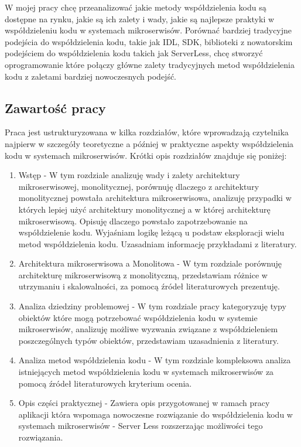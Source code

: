 \documentclass[runningheads,12pt]{llncs}
\begin{document}
W mojej pracy chcę przeanalizować jakie metody współdzielenia kodu są dostępne na rynku, jakie są ich zalety i wady, jakie są najlepsze praktyki w współdzieleniu kodu w systemach mikroserwisów. Porównać bardziej tradycyjne podejścia do współdzielenia kodu, takie jak IDL, SDK, biblioteki z nowatorskim podejściem do współdzielenia kodu takich jak ServerLess, chcę stworzyć oprogramowanie które połączy główne zalety tradycyjnych metod współdzielenia kodu z zaletami bardziej nowoczesnych podejść.

\newpage

\subsection{Zawartość pracy}
Praca jest ustrukturyzowana w kilka rozdziałów, które wprowadzają czytelnika najpierw w szczegóły teoretyczne a później w praktyczne aspekty współdzielenia kodu w systemach mikroserwisów. Krótki opis rozdziałów znajduje się poniżej:
\begin{enumerate}
    \item Wstęp - W tym rozdziale analizuję wady i zalety architektury mikroserwisowej, monolitycznej, porównuję dlaczego z architektury monolitycznej powstała architektura mikroserwisowa, analizuję przypadki w których lepiej użyć architektury monolitycznej a w której architekturę mikroserwisową. Opisuję dlaczego powstało zapotrzebowanie na współdzielenie kodu. Wyjaśniam logikę leżącą u podstaw eksploracji wielu metod współdzielenia kodu. Uzasadniam informację przykładami z literatury.
    \item Architektura mikroserwisowa a Monolitowa - W tym rozdziale porównuję architekturę mikroserwisową z monolityczną, przedstawiam różnice w utrzymaniu i skalowalności, za pomocą źródeł literaturowych prezentuję.
    \item Analiza dziedziny problemowej - W tym rozdziale pracy kategoryzuję typy obiektów które mogą potrzebować współdzielenia kodu w systemie mikroserwisów, analizuję możliwe wyzwania związane z współdzieleniem poszczególnych typów obiektów, przedstawiam uzasadnienia z literatury.
    \item Analiza metod współdzielenia kodu - W tym rozdziale kompleksowa analiza istniejących metod współdzielenia kodu w systemach mikroserwisów za pomocą źródeł literaturowych kryterium ocenia.
    \item Opis części praktycznej - Zawiera opis przygotowanej w ramach pracy aplikacji która wspomaga nowoczesne rozwiązanie do współdzielenia kodu w systemach mikroserwisów - Server Less rozszerzając możliwości tego rozwiązania.
\end{enumerate}
\end{document}
